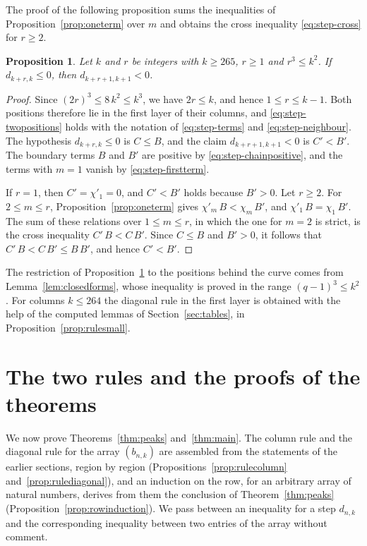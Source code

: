 \documentclass{amsart}
\newtheorem{proposition}[theorem]{Proposition}
\theoremstyle{definition}
\theoremstyle{remark}
\numberwithin{equation}{section}
\begin{document}
The proof of the following proposition sums the inequalities of
Proposition~\ref{prop:oneterm} over $m$ and obtains the cross inequality
\eqref{eq:step-cross} for $r\ge2$.

\begin{proposition}\label{prop:diagonalstep}
Let $k$ and $r$ be integers with $k\ge265$,
$r\ge1$ and $r^3\le k^2$. If $d_{k+r,k}\le0$, then $d_{k+r+1,k+1}<0$.
\end{proposition}

\begin{proof}
Since $(2r)^3\le8\,k^2\le k^3$, we have $2r\le k$, and hence
$1\le r\le k-1$. Both positions therefore lie in the first layer of their
columns, and \eqref{eq:step-twopositions} holds with the notation of
\eqref{eq:step-terms} and \eqref{eq:step-neighbour}. The hypothesis
$d_{k+r,k}\le0$ is $C\le B$, and the claim $d_{k+r+1,k+1}<0$ is $C'<B'$. The
boundary terms $B$ and $B'$ are positive by \eqref{eq:step-chainpositive},
and the terms with $m=1$ vanish by \eqref{eq:step-firstterm}.

If $r=1$, then $C'=\chi'_1=0$, and $C'<B'$ holds because $B'>0$. Let
$r\ge2$. For $2\le m\le r$, Proposition~\ref{prop:oneterm} gives
$\chi'_m\,B<\chi_m\,B'$, and $\chi'_1\,B=\chi_1\,B'$. The sum of these
relations over $1\le m\le r$, in which the one for $m=2$ is strict, is the
cross inequality $C'\,B<C\,B'$. Since $C\le B$ and $B'>0$, it follows that
$C'\,B<C\,B'\le B\,B'$, and hence $C'<B'$.
\end{proof}

The restriction of Proposition~\ref{prop:diagonalstep} to the positions
behind the curve comes from Lemma~\ref{lem:closedforms}, whose inequality
is proved in the range $(q-1)^3\le k^2$. For
columns $k\le264$ the diagonal rule in the first layer is
obtained with the help of the computed lemmas of
Section~\ref{sec:tables}, in Proposition~\ref{prop:rulesmall}.

\section{The two rules and the proofs of the theorems}\label{sec:staircase}
We now prove Theorems~\ref{thm:peaks} and~\ref{thm:main}. The column
rule and the diagonal rule for the array $(b_{n,k})$ are
assembled from the statements of the earlier sections, region by region
(Propositions~\ref{prop:rulecolumn} and~\ref{prop:rulediagonal}), and an
induction on the row, for an arbitrary array of natural numbers, derives
from them the conclusion of Theorem~\ref{thm:peaks}
(Proposition~\ref{prop:rowinduction}). We pass between an inequality for a step
$d_{n,k}$ and the corresponding inequality between two entries of the array
without comment.
\end{document}
